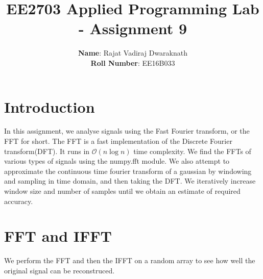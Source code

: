 \documentclass[11pt]{article}
\title{EE2703 Applied Programming Lab - Assignment 9}
\author{
  \textbf{Name}: Rajat Vadiraj Dwaraknath\\
  \textbf{Roll Number}: EE16B033
}
\begin{document}
    
    
    \maketitle
    
    

    
	

	
		
    \section{Introduction}\label{introduction}

In this assignment, we analyse signals using the Fast Fourier transform,
or the FFT for short. The FFT is a fast implementation of the Discrete
Fourier transform(DFT). It runs in \(\mathcal{O}(n \log n)\) time
complexity. We find the FFTs of various types of signals using the
numpy.fft module. We also attempt to approximate the continuous time
fourier transform of a gaussian by windowing and sampling in time
domain, and then taking the DFT. We iteratively increase window size and
number of samples until we obtain an estimate of required accuracy.

	

	

	

	
		
    \section{FFT and IFFT}\label{fft-and-ifft}

	

	
		
    We perform the FFT and then the IFFT on a random array to see how well
the original signal can be reconstruced.

	

	
		
	
	
		
	
		
			
		
	
		
			
		
	
		
			
		
	
		
			
		
	
		
			
		
	
		
			
\end{document}
